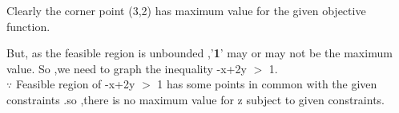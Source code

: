 \documentclass[10pt, a4paper]{article}
\begin{document}
Clearly the corner point (3,2) has maximum value for the given objective function.

But, as the feasible region is unbounded ,'\textbf{1}' may or may not be the maximum value. So ,we need to graph the inequality -x+2y $>$ 1.\\
$\because$ Feasible region of -x+2y $>$ 1 has some  points in common with the given constraints .so ,there is no maximum value for  z subject to given constraints.
\end{document}
